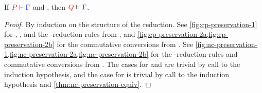 \begin{theorem}[Preservation]\label{thm:nc-preservation}
  If $\seq[{ P }]{ \Gamma }$ and ,
  then $\seq[{ Q }]{ \Gamma }$.
\end{theorem}
\begin{proof}
  By induction on the structure of the reduction. See
  \cref{fig:cp-preservation-1} for , , and the
  \textbeta-reduction rules from \cp, and
  \cref{fig:cp-preservation-2a,fig:cp-preservation-2b} for the commutative
  conversions from \cp. 
  See \cref{fig:nc-preservation-1,fig:nc-preservation-2a,fig:nc-preservation-2b}
  for the \textbeta-reduction rules and commutative conversions from \nodcap.
  The cases for \cpRedGammaCut and \ncRedGammaPool are trivial by call to the
  induction hypothesis, and the case for \cpRedGammaEquiv is trivial by call to
  the induction hypothesis and \cref{thm:nc-preservation-equiv}.
\end{proof}
